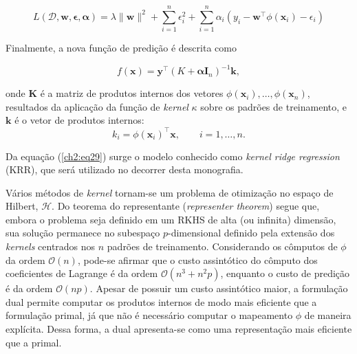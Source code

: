 \begin{equation}
    \label{ch2:27}
    L(\mathcal{D}, \mathbf{w}, \boldsymbol{\epsilon}, \boldsymbol{\alpha}) = \lambda \|\mathbf{w}\|^2 + \sum_{i=1}^{n}{\epsilon_i^{2} + \sum_{i=1}^{n} \alpha_i(y_i - \mathbf{w}^{\top}\phi(\mathbf{x}_i) - \epsilon_i)}
\end{equation}

Finalmente, a nova função de predição é descrita como

\begin{equation}
    \label{ch2:eq29}
    f(\mathbf{x}) = \mathbf{y}^{\top}(K + \boldsymbol{\alpha}\mathbf{I}_n)^{-1}\mathbf{k},
\end{equation}

\noindent onde $\mathbf{K}$ é a matriz de produtos internos dos vetores $\phi(\mathbf{x}_i), \ldots, \phi(\mathbf{x}_n)$, resultados da aplicação da função de \textit{kernel} $\kappa$ sobre os padrões de treinamento, e $\mathbf{k}$ é o vetor de produtos internos: \[ k_i = \phi(\mathbf{x}_i)^{\top}\mathbf{x}, \quad\quad i = 1,\ldots,n. \]

Da equação (\ref{ch2:eq29}) surge o modelo conhecido como \textit{kernel ridge regression} (KRR), que será utilizado no decorrer desta monografia.

Vários métodos de \textit{kernel} tornam-se um problema de otimização no espaço de Hilbert, $\mathcal{H}$. Do teorema do representante (\textit{representer theorem}) \cite{aronszajn1950,scholkopf2001} segue que, embora o problema seja definido em um RKHS de alta (ou infinita) dimensão, sua solução permanece no subespaço $p$-dimensional definido pela extensão dos \textit{kernels} centrados nos $n$ padrões de treinamento. Considerando os cômputos de $\phi$ da ordem $\mathcal{O}(n)$, pode-se afirmar que o custo assintótico do cômputo dos coeficientes de Lagrange é da ordem $\mathcal{O}(n^3 + n^2p)$, enquanto o custo de predição é da ordem $\mathcal{O}(np)$. Apesar de possuir um custo assintótico maior, a formulação dual permite computar os produtos internos de modo mais eficiente que a formulação primal, já que não é necessário computar o mapeamento $\phi$ de maneira explícita. Dessa forma, a dual apresenta-se como uma representação mais eficiente que a primal.



